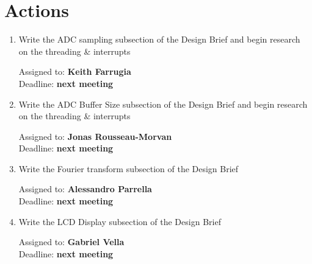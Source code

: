 \documentclass{cce2014-meetings}
\begin{document}
\section*{Actions}

\begin{enumerate}

      \item Write the ADC sampling subsection of the Design Brief and begin
            research on the threading \& interrupts
            \begin{flushright}
                  Assigned to: \textbf{Keith Farrugia} \\
                  Deadline: \textbf{next meeting}
            \end{flushright}

      \item Write the ADC Buffer Size subsection of the Design Brief and begin
            research on the threading \& interrupts
            \begin{flushright}
                  Assigned to: \textbf{Jonas Rousseau-Morvan} \\
                  Deadline: \textbf{next meeting}
            \end{flushright}

      \item Write the Fourier transform subsection of the Design Brief
            \begin{flushright}
                  Assigned to: \textbf{Alessandro Parrella} \\
                  Deadline: \textbf{next meeting}
            \end{flushright}

      \item Write the LCD Display subsection of the Design Brief
            \begin{flushright}
                  Assigned to: \textbf{Gabriel Vella} \\
                  Deadline: \textbf{next meeting}
            \end{flushright}


\end{enumerate}
\end{document}
